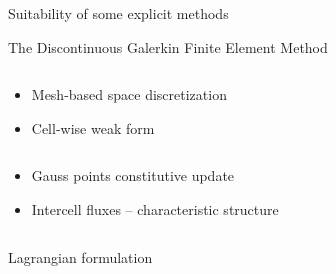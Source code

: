 \begin{frame}{Suitability of some explicit methods}
\begin{block}{The Discontinuous Galerkin Finite Element Method \cite{Cockburn}}
\begin{overprint}
      \begin{columns}
        \begin{footnotesize}
          \begin{column}{0.4\textwidth}
            \begin{itemize}
            \item[] Mesh-based space discretization
            \item[] Cell-wise weak form \cite{NeutronDG}
            \end{itemize}
          \end{column}
          \begin{column}{0.6\textwidth}
            \begin{itemize}
            \item[] Gauss points constitutive update
            \item[] Intercell fluxes -- characteristic structure
            \end{itemize}
          \end{column}
        \end{footnotesize}
      \end{columns}
      \vskip -10pt
      \begin{columns}
        \begin{column}{0.48\textwidth}
          \begin{block}{\footnotesize Lagrangian formulation \cite{LagrangianDG_thesis}}
            \centering
          \end{block}
        \end{column}
        \begin{column}{0.48\textwidth}
              

\end{column}
\end{columns}
\end{overprint}
\end{block}
\end{frame}
